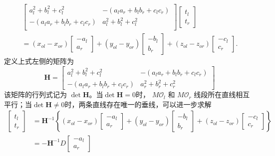 \begin{align}  	
\begin{bmatrix}
a_l^2 + b_l^2 + c_l^2       & -(a_la_r + b_lb_r + c_lc_r) \\
-(a_la_r + b_lb_r + c_lc_r) & a_l^2 + b_l^2 + c_l^2 \\    
\end{bmatrix}	
\begin{bmatrix}
t_l \\ 
t_r 
\end{bmatrix} \nonumber \\
=(x_{ol}-x_{or})
\begin{bmatrix}
-a_l \\
a_r 
\end{bmatrix}
+(y_{ol}-y_{or})
\begin{bmatrix}
-b_l \\
b_r 
\end{bmatrix} \nonumber 
+(z_{ol}-z_{or})
\begin{bmatrix}
-c_l \\
c_r
\end{bmatrix}.
\end{align}
定义上式左侧的矩阵为
\begin{equation} 
{\mathbf{H}} = \left[ {\begin{array}{*{20}{c}}
	{a_l^2 + b_l^2 + c_l^2}&{ - \left( {{a_l}{a_r} + {b_l}{b_r} + {c_l}{c_r}} \right)} \\ 
	{ - \left( {{a_l}{a_r} + {b_l}{b_r} + {c_l}{c_r}} \right)}&{a_r^2 + b_r^2 + c_r^2} 
	\end{array}} \right]
\end{equation}
该矩阵的行列式记为 $\det \mathbf{H} $。当$\det \mathbf{H} = 0$时， $M\mathcal{O}_l$ 和 $M\mathcal{O}_r$ 线段所在直线相互平行；当$\det \mathbf{H} \neq 0$时，两条直线存在唯一的垂线，可以进一步求解
\begin{align} 
\left[ {\begin{array}{*{20}{c}}
	{{t_l}} \\ 
	{{t_r}} 
	\end{array}} \right] &= {{\mathbf{H}}^{ - 1}}\left\{ {\left( {{x_{ol}} - {x_{or}}} \right)\left[ {\begin{array}{*{20}{c}}
		{ - {a_l}} \\ 
		{{a_r}} 
		\end{array}} \right] + \left( {{y_{ol}} - {y_{or}}} \right)\left[ {\begin{array}{*{20}{c}}
		{ - {b_l}} \\ 
		{{b_r}} 
		\end{array}} \right] + \left( {{z_{ol}} - {z_{or}}} \right)\left[ {\begin{array}{*{20}{c}}
		{ - {c_l}} \\ 
		{{c_r}} 
		\end{array}} \right]} \right\}\\ &=  - {{\mathbf{H}}^{ - 1}}D\left[ {\begin{array}{*{20}{c}}
	{ - {a_l}} \\ 
	{{a_r}} 
	\end{array}} \right]
\end{align}
